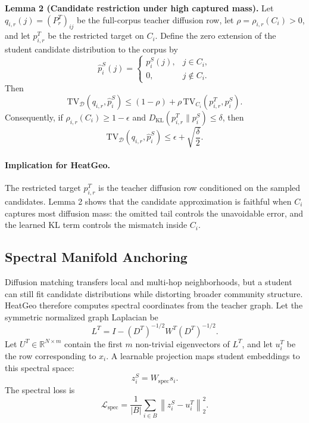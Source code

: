 \smallskip
\noindent\textbf{Lemma 2 (Candidate restriction under high captured mass).}
Let $q_{i,r}(j)=(P_r^T)_{ij}$ be the full-corpus teacher diffusion row, let $\rho=\rho_{i,r}(C_i)>0$, and let $p^T_{i,r}$ be the restricted target on $C_i$. Define the zero extension of the student candidate distribution to the corpus by
\begin{equation}
    \widehat p_i^S(j)=
    \begin{cases}
    p_i^S(j), & j\in C_i,\\
    0, & j\notin C_i.
    \end{cases}
\end{equation}
Then
\begin{equation}
    \mathrm{TV}_{\mathcal{D}}\left(q_{i,r},\widehat p_i^S\right)
    \le
    (1-\rho)
    +\rho\,\mathrm{TV}_{C_i}\left(p^T_{i,r},p_i^S\right).
\end{equation}
Consequently, if $\rho_{i,r}(C_i)\ge 1-\epsilon$ and
$D_{\mathrm{KL}}\left(p^T_{i,r}\|p_i^S\right)\le \delta$, then
\begin{equation}
    \mathrm{TV}_{\mathcal{D}}\left(q_{i,r},\widehat p_i^S\right)
    \le
    \epsilon + \sqrt{\frac{\delta}{2}}.
\end{equation}

\paragraph{Implication for HeatGeo.}
The restricted target $p^T_{i,r}$ is the teacher diffusion row conditioned on the sampled candidates. Lemma 2 shows that the candidate approximation is faithful when $C_i$ captures most diffusion mass: the omitted tail controls the unavoidable error, and the learned KL term controls the mismatch inside $C_i$.

\subsection{Spectral Manifold Anchoring}

Diffusion matching transfers local and multi-hop neighborhoods, but a student can still fit candidate distributions while distorting broader community structure. HeatGeo therefore computes spectral coordinates from the teacher graph. Let the symmetric normalized graph Laplacian be
\begin{equation}
    L^T = I - (D^T)^{-1/2}W^T(D^T)^{-1/2}.
\end{equation}
Let $U^T\in\mathbb{R}^{N\times m}$ contain the first $m$ non-trivial eigenvectors of $L^T$, and let $u_i^T$ be the row corresponding to $x_i$. A learnable projection maps student embeddings to this spectral space:
\begin{equation}
    z_i^S = W_{\mathrm{spec}}s_i.
\end{equation}
The spectral loss is
\begin{equation}
    \mathcal{L}_{\mathrm{spec}}
    =
    \frac{1}{|B|}
    \sum_{i\in B}
    \left\|
    z_i^S-u_i^T
    \right\|_2^2.
\end{equation}

